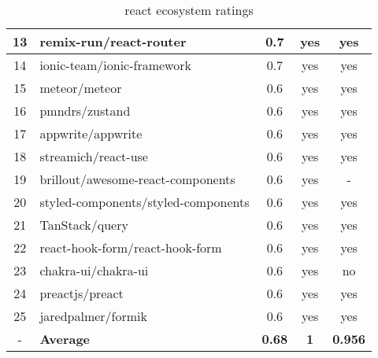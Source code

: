 \begin{table}[H]
{\begin{tabular}{|c|l|c|c|c|}
            13 & remix-run/react-router              & 0.7                & yes                        & yes                \\ \hline
            14 & ionic-team/ionic-framework          & 0.7                & yes                        & yes                \\ \hline
            15 & meteor/meteor                       & 0.6                & yes                        & yes                \\ \hline
            16 & pmndrs/zustand                      & 0.6                & yes                        & yes                \\ \hline
            17 & appwrite/appwrite                   & 0.6                & yes                        & yes                \\ \hline
            18 & streamich/react-use                 & 0.6                & yes                        & yes                \\ \hline
            19 & brillout/awesome-react-components   & 0.6                & yes                        & -                  \\ \hline
            20 & styled-components/styled-components & 0.6                & yes                        & yes                \\ \hline
            21 & TanStack/query                      & 0.6                & yes                        & yes                \\ \hline
            22 & react-hook-form/react-hook-form     & 0.6                & yes                        & yes                \\ \hline
            23 & chakra-ui/chakra-ui                 & 0.6                & yes                        & no                 \\ \hline
            24 & preactjs/preact                     & 0.6                & yes                        & yes                \\ \hline
            25 & jaredpalmer/formik                  & 0.6                & yes                        & yes                \\ \hline
            -  & \textbf{Average}                    & \textbf{0.68}      & \textbf{1}                 & \textbf{0.956}     \\ \hline
        \end{tabular}
    }
    \caption{react ecosystem ratings}
    \label{tab:metrics:react:ratings}
\end{table}

